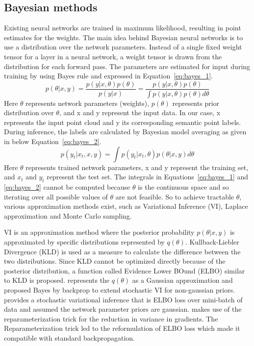     \subsection{Bayesian methods}
    Existing neural networks are trained in maximum likelihood, resulting in point estimates for the weights.
    The main idea behind Bayesian neural networks is to use a distribution over the network parameters.
    Instead of a single fixed weight tensor for a layer in a neural network, a weight tensor is drawn from the distribution for each forward pass.
    The parameters are estimated for input during training by using Bayes rule and expressed in Equation~\ref{eq:bayes_1}.
    \begin{equation}
        p(\theta|x, y) = \frac{p(y|x, \theta)p(\theta)}{p(y|x)} = \frac{p(y|x, \theta)p(\theta)}{\int p(y|x, \theta) p(\theta) d\theta} \label{eq:bayes_1}
    \end{equation}
    Here $\theta$ represents network parameters (weights), $p(\theta)$ represents prior distribution over $\theta$, and x and y represent the input data. In our case, x represents the input point cloud and y its corresponding semantic point labels.
    During inference, the labels are calculated by Bayesian model averaging as given in below Equation~\ref{eq:bayes_2}.
    \begin{equation}
        p(y_t|x_t, x, y) = \int p(y_t|x_t, \theta)p(\theta|x, y)d\theta \label{eq:bayes_2}  
    \end{equation}
    Here $\theta$ represents trained network parameters, x and y represent the training set, and $x_t$ and $y_t$ represent the test set.
    The integrals in Equations~\ref{eq:bayes_1} and \ref{eq:bayes_2} cannot be computed because $\theta$ is the continuous space and so iterating over all possible values of $\theta$ are not feasible.
    So to achieve tractable $\theta$, various approximation methods exist, such as Variational Inference (VI), Laplace approximation and Monte Carlo sampling.

    VI is an approximation method where the posterior probability $p(\theta|x, y)$ is approximated by specific distributions represented by $q(\theta)$.
    Kullback-Liebler Divergence (KLD) is used as a measure to calculate the difference between the two distributions. 
    Since KLD cannot be optimized directly because of the posterior distribution, a function called Evidence Lower BOund (ELBO) similar to KLD is proposed.
    \cite{Gaussian_Priors} represents the $q(\theta)$ as a Gaussian approximation and \cite{weight_uncertainty} proposed Bayes by backprop to extend stochastic VI for non-gaussian priors.
    \cite{Non_Gaussian_Priors} provides a stochastic variational inference that is ELBO loss over mini-batch of data and assumed the network parameter priors are gaussian.
    \cite{Flipout} makes use of the reparameterization trick for the reduction in variance in gradients. The Reparameterization trick led to the reformulation of ELBO loss which made it compatible with standard backpropagation.

